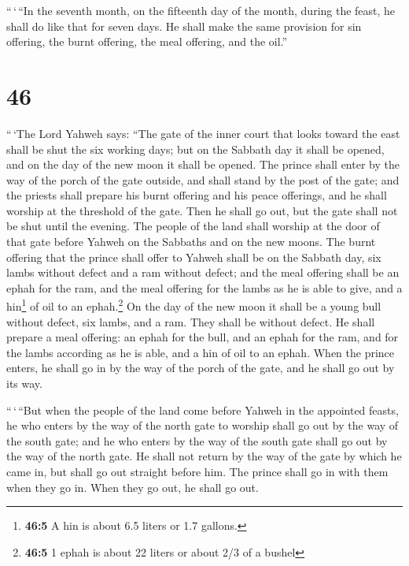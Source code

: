 ``\,`\,``In the seventh month, on the fifteenth day of
the month, during the feast, he shall do like that for seven days. He
shall make the same provision for sin offering, the burnt offering, the
meal offering, and the oil.''

\hypertarget{section-45}{%
\section{46}\label{section-45}}

 ``\,`The Lord Yahweh says: ``The gate of the inner court
that looks toward the east shall be shut the six working days; but on
the Sabbath day it shall be opened, and on the day of the new moon it
shall be opened.  The prince shall enter by the way of the
porch of the gate outside, and shall stand by the post of the gate; and
the priests shall prepare his burnt offering and his peace offerings,
and he shall worship at the threshold of the gate. Then he shall go out,
but the gate shall not be shut until the evening.  The
people of the land shall worship at the door of that gate before Yahweh
on the Sabbaths and on the new moons.  The burnt offering
that the prince shall offer to Yahweh shall be on the Sabbath day, six
lambs without defect and a ram without defect;  and the
meal offering shall be an ephah for the ram, and the meal offering for
the lambs as he is able to give, and a hin\footnote{\textbf{46:5} A hin
  is about 6.5 liters or 1.7 gallons.} of oil to an ephah.\footnote{\textbf{46:5}
  1 ephah is about 22 liters or about 2/3 of a bushel}  On
the day of the new moon it shall be a young bull without defect, six
lambs, and a ram. They shall be without defect.  He shall
prepare a meal offering: an ephah for the bull, and an ephah for the
ram, and for the lambs according as he is able, and a hin of oil to an
ephah.  When the prince enters, he shall go in by the way
of the porch of the gate, and he shall go out by its way.

 ``\,`\,``But when the people of the land come before
Yahweh in the appointed feasts, he who enters by the way of the north
gate to worship shall go out by the way of the south gate; and he who
enters by the way of the south gate shall go out by the way of the north
gate. He shall not return by the way of the gate by which he came in,
but shall go out straight before him.  The prince shall
go in with them when they go in. When they go out, he shall go out.

